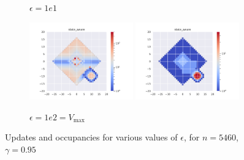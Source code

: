 \documentclass{article}
\begin{document}
\begin{figure}[H]
\begin{subfigure}[b]{\textwidth}
        \caption{$\epsilon=1e1$}
    \end{subfigure}
    \begin{subfigure}[b]{\textwidth}
        \centering
        \includegraphics[width=0.49\textwidth]{img/epsilon/1e2/updates_state_aware.pdf}
        \includegraphics[width=0.49\textwidth]{img/epsilon/1e2/occupations_state_aware.pdf}
        \caption{$\epsilon=1e2 = V_{\max}$}
    \end{subfigure}
    \caption{Updates and occupancies for various values of $\epsilon$, for $n = 5460$, $\gamma=0.95$}
\end{figure}
\end{document}
